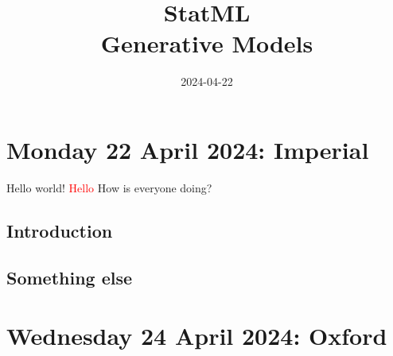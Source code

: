 \documentclass{article}
\date{2024-04-22}
\title{StatML\\Generative Models}
\begin{document}
  \maketitle
  \tableofcontents

  \newpage

  \section{Monday 22 April 2024: Imperial}

  Hello world!
  \textcolor{red}{Hello}
  How is everyone doing?

  \subsection{Introduction}

  \subsection{Something else}

  \newpage

  \section{Wednesday 24 April 2024: Oxford}
\end{document}

